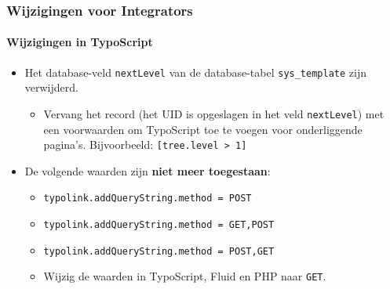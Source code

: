
\begin{frame}[fragile]
	\frametitle{Wijzigingen voor Integrators}
	\framesubtitle{Wijzigingen in TypoScript}

	\begin{itemize}
		\item Het database-veld \texttt{nextLevel} van de database-tabel
			\texttt{sys\_template} zijn verwijderd.

			\begin{itemize}\smaller
				\item[\ding{228}] Vervang het record (het UID is opgeslagen in het veld \texttt{nextLevel}) met een voorwaarden om TypoScript toe te voegen voor onderliggende pagina's. Bijvoorbeeld: \texttt{[tree.level > 1]}
			\end{itemize}\normalsize

		\item De volgende waarden zijn \textbf{niet meer toegestaan}:

			\begin{itemize}\smaller
				\item \texttt{typolink.addQueryString.method = POST}
				\item \texttt{typolink.addQueryString.method = GET,POST}
				\item \texttt{typolink.addQueryString.method = POST,GET}
			\end{itemize}\normalsize

			\begin{itemize}\smaller
				\item[\ding{228}] Wijzig de waarden in TypoScript, Fluid en PHP naar \texttt{GET}.
			\end{itemize}\normalsize

	\end{itemize}

\end{frame}



